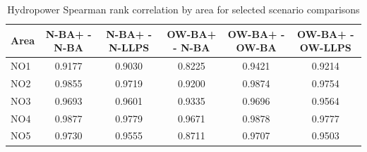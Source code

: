 \begin{table}[htbp]
\centering
\caption{Hydropower Spearman rank correlation by area for selected scenario comparisons}
\label{tab:spearman_area_pairs}
\begin{tabular}{lccccc}
\hline
Area & N-BA+ - N-BA & N-BA+ - N-LLPS & OW-BA+ - N-BA & OW-BA+ - OW-BA & OW-BA+ - OW-LLPS \\
\hline
NO1 & 0.9177 & 0.9030 & 0.8225 & 0.9421 & 0.9214 \\
NO2 & 0.9855 & 0.9719 & 0.9200 & 0.9874 & 0.9754 \\
NO3 & 0.9693 & 0.9601 & 0.9335 & 0.9696 & 0.9564 \\
NO4 & 0.9877 & 0.9779 & 0.9671 & 0.9878 & 0.9777 \\
NO5 & 0.9730 & 0.9555 & 0.8711 & 0.9707 & 0.9503 \\
\hline
\end{tabular}
\end{table}